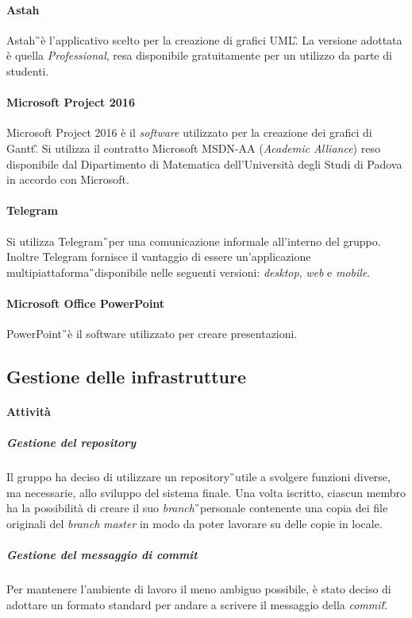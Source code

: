 \paragraph{Astah} Astah\G\ è l'applicativo scelto per la creazione di grafici UML\G. La versione adottata è quella \textit{Professional}, resa disponibile gratuitamente per un utilizzo da parte di studenti.
\paragraph{Microsoft Project 2016} Microsoft Project 2016 è il \textit{software} utilizzato per la creazione dei grafici di Gantt\G. Si utilizza il contratto Microsoft MSDN-AA (\textit{Academic Alliance}) reso disponibile dal Dipartimento di Matematica dell'Università degli Studi di Padova in accordo con Microsoft.
\paragraph{Telegram} Si utilizza Telegram\G\ per una comunicazione informale all'interno del 
gruppo. Inoltre Telegram fornisce il vantaggio di essere un'applicazione 
multipiattaforma\G\ disponibile nelle seguenti versioni: \textit{desktop}, \textit{web} e \textit{mobile}.
\paragraph{Microsoft Office PowerPoint} PowerPoint\G\ è il software utilizzato per creare presentazioni.

\subsection{Gestione delle infrastrutture}

\paragraph{Attività} 
\subparagraph{Gestione del repository} Il gruppo ha deciso di utilizzare un repository\G\ utile a svolgere funzioni diverse, ma necessarie, allo sviluppo del sistema finale. Una volta iscritto, ciascun membro ha la possibilità di creare il suo \textit{branch}\G\ personale contenente una copia dei file originali del \textit{branch} \textit{master} in modo da poter lavorare su delle copie in locale.

\subparagraph{Gestione del messaggio di commit} Per mantenere l'ambiente di lavoro il meno ambiguo possibile, è stato deciso di adottare un formato standard per andare a scrivere il messaggio della \textit{commit}\G.

